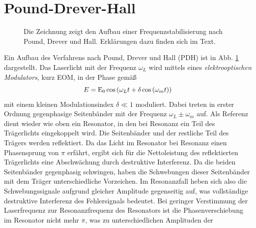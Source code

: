 \section{Pound-Drever-Hall}\label{sec:pound-drever-hall}
\begin{figure}[h]
 	\centering
	\caption[Pound-Drever-Hall - Aufbau]{Die Zeichnung zeigt den Aufbau
	einer Frequenzstabilisierung nach Pound, Drever und Hall. Erklärungen dazu
	finden sich im Text.}\label{fig:pound-drever-hall_aufbau}
\end{figure}
Ein Aufbau des Verfahrens nach Pound, Drever und Hall (PDH) ist in Abb.
\ref{fig:pound-drever-hall_aufbau} dargestellt.
Das Laserlicht mit der Frequenz $\omega_L$ wird mittels eines \textit{elektrooptischen Modulators}, kurz EOM, in der Phase gemäß
\begin{equation}\label{eq:pound-drever-hall_01}
	E=\operatorname{E}_0\cos{\left(\omega_Lt+\delta\cos{(\omega_mt)}\right)}
\end{equation}
mit einem kleinen Modulationsindex $\delta\ll1$ moduliert. Dabei treten in
erster Ordnung gegenphasige Seitenbänder mit der Frequenz $\omega_L\pm\omega_m$
auf. Als Referenz dient wieder wie oben ein Resonator, in den bei Resonanz ein
Teil des Trägerlichts eingekoppelt wird. Die Seitenbänder und der restliche Teil
des Trägers werden reflektiert. Da das Licht im Resonator bei Resonanz einen
Phasensprung von $\pi$ erfährt, ergibt sich für die Nettoleistung des
reflektierten Trägerlichts eine Abschwächung durch destruktive Interferenz.
Da die beiden Seitenbänder gegenphasig schwingen, haben die Schwebungen dieser
Seitenbänder mit dem Träger unterschiedliche Vorzeichen. Im Resonanzfall heben
sich also die Schwebungssignale aufgrund gleicher Amplitude gegenseitig auf, was
vollständige destruktive Interferenz des Fehlersignals bedeutet. Bei geringer
Verstimmung der Laserfrequenz zur Resonanzfrequenz des Resonators ist die
Phasenverschiebung im Resonator nicht mehr $\pi$, was zu unterschiedlichen Amplituden der
